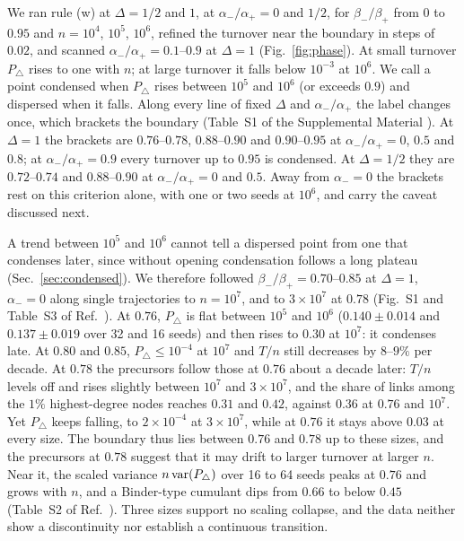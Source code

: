 \documentclass[aps,pre,twocolumn,superscriptaddress,floatfix,nofootinbib]{revtex4-2}
\begin{document}
We ran rule (w) at $\Delta=1/2$ and $1$, at $\alpha_-/\alpha_+=0$ and $1/2$,
for $\beta_-/\beta_+$ from $0$ to $0.95$ and $n=10^4$, $10^5$, $10^6$, refined
the turnover near the boundary in steps of $0.02$, and scanned
$\alpha_-/\alpha_+=0.1$--$0.9$ at $\Delta=1$ (Fig.~\ref{fig:phase}). At small
turnover $P_\triangle$ rises to one with $n$; at large turnover it falls below
$10^{-3}$ at $10^6$. We call a point condensed when $P_\triangle$ rises between
$10^5$ and $10^6$ (or exceeds $0.9$) and dispersed when it falls. Along every
line of fixed $\Delta$ and $\alpha_-/\alpha_+$ the label changes once, which
brackets the boundary (Table~S1 of the Supplemental Material \cite{supp}). At
$\Delta=1$ the brackets are $0.76$--$0.78$, $0.88$--$0.90$ and $0.90$--$0.95$
at $\alpha_-/\alpha_+=0$, $0.5$ and $0.8$; at $\alpha_-/\alpha_+=0.9$ every
turnover up to $0.95$ is condensed. At $\Delta=1/2$ they are $0.72$--$0.74$ and
$0.88$--$0.90$ at $\alpha_-/\alpha_+=0$ and $0.5$. Away from $\alpha_-=0$ the
brackets rest on this criterion alone, with one or two seeds at $10^6$, and
carry the caveat discussed next.

A trend between $10^5$ and $10^6$ cannot tell a dispersed point from one that
condenses later, since without opening condensation follows a long plateau
(Sec.~\ref{sec:condensed}). We therefore followed $\beta_-/\beta_+=0.70$--$0.85$
at $\Delta=1$, $\alpha_-=0$ along single trajectories to $n=10^7$, and to
$3\times10^7$ at $0.78$ (Fig.~S1 and Table~S3 of Ref.~\cite{supp}). At $0.76$,
$P_\triangle$ is flat between $10^5$ and $10^6$ ($0.140\pm0.014$ and
$0.137\pm0.019$ over 32 and 16 seeds) and then rises to $0.30$ at $10^7$: it
condenses late. At $0.80$ and $0.85$, $P_\triangle\le10^{-4}$ at $10^7$ and
$T/n$ still decreases by $8$--$9\%$ per decade. At $0.78$ the precursors follow
those at $0.76$ about a decade later: $T/n$ levels off and rises slightly
between $10^7$ and $3\times10^7$, and the share of links among the $1\%$
highest-degree nodes reaches $0.31$ and $0.42$, against $0.36$ at $0.76$ and
$10^7$. Yet $P_\triangle$ keeps falling, to $2\times10^{-4}$ at
$3\times10^7$, while at $0.76$ it stays above $0.03$ at every size. The boundary thus
lies between $0.76$ and $0.78$ up to these sizes, and the precursors at $0.78$
suggest that it may drift to larger turnover at larger $n$. Near it, the scaled
variance $n\,{\rm var}(P_\triangle)$ over 16 to 64 seeds peaks at $0.76$ and
grows with $n$, and a Binder-type cumulant dips from $0.66$ to below $0.45$
(Table~S2 of Ref.~\cite{supp}). Three sizes support no scaling collapse, and the
data neither show a discontinuity nor establish a continuous transition.
\end{document}
